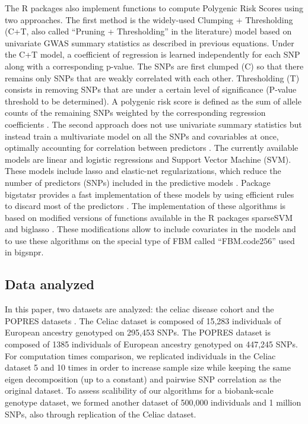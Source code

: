 \documentclass{bioinfo}
\begin{document}
\begin{methods}
The R packages also implement functions to compute Polygenic Risk Scores using two approaches. 
The first method is the widely-used Clumping + Thresholding (C+T, also called ``Pruning + Thresholding'' in the literature) model based on univariate GWAS summary statistics as described in previous equations. Under the C+T model, a coefficient of regression is learned independently for each SNP along with a corresponding p-value. The SNPs are first clumped (C) so that there remains only SNPs that are weakly correlated with each other. Thresholding (T) consists in removing SNPs that are under a certain level of significance (P-value threshold to be determined). A polygenic risk score is defined as the sum of allele counts of the remaining SNPs weighted by the corresponding regression coefficients \cite[]{Chatterjee2013,Dudbridge2013,Golan2014}. 
The second approach does not use univariate summary statistics but instead train a multivariate model on all the SNPs and covariables at once, optimally accounting for correlation between predictors \cite[]{Abraham2012}. The currently available models are linear and logistic regressions and Support Vector Machine (SVM). These models include lasso and elastic-net regularizations, which reduce the number of  predictors (SNPs) included in the predictive models \cite[]{Friedman2010,Tibshirani1996,Zou2005}. Package bigstatsr provides a fast implementation of these models by using efficient rules to discard most of the predictors \cite[]{Tibshirani2012}. The implementation of these algorithms is based on modified versions of functions available in the R packages sparseSVM and biglasso \cite[]{Zeng2017}. These modifications allow to include covariates in the models and to use these algorithms on the special type of FBM called ``FBM.code256'' used in bigsnpr.

\subsection{Data analyzed}

In this paper, two datasets are analyzed: the celiac disease cohort and the POPRES datasets \cite[]{Dubois2010,Nelson2008}. The Celiac dataset is composed of 15,283 individuals of European ancestry genotyped on 295,453 SNPs. The POPRES dataset is composed of 1385 individuals of European ancestry genotyped on 447,245 SNPs.
For computation times comparison, we replicated individuals in the Celiac dataset 5 and 10 times in order to increase sample size while keeping the same {\color{red} eigen decomposition (up to a constant) and pairwise SNP correlation} as the original dataset. To assess scalibility of our algorithms for a biobank-scale genotype dataset, we formed another dataset of 500,000 individuals and 1 million SNPs, also through replication of the Celiac dataset. \label{sec:rep}


\end{methods}
\end{document}
